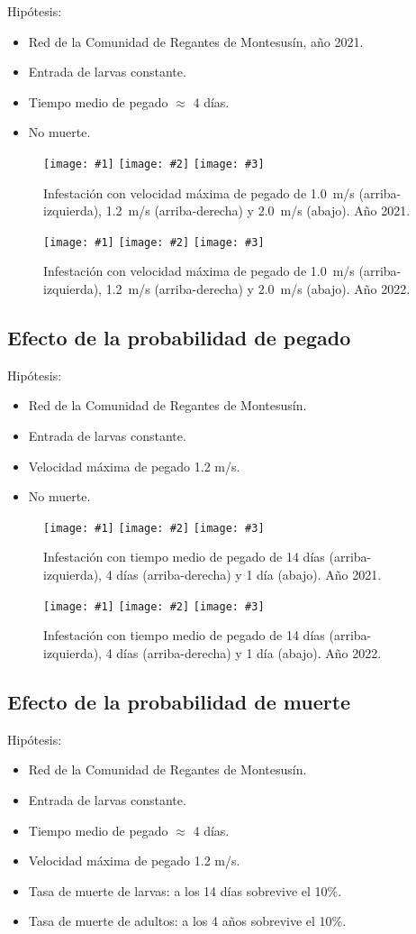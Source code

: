 \documentclass[a4paper]{article}
\newcommand{\FIGIII}[5]
{
	\begin{figure}[ht!]
		\centering
		\texttt{[image: \#1]}
		\texttt{[image: \#2]}
		\texttt{[image: \#3]}
		\caption{#4.\label{#5}}
	\end{figure}
}
\begin{document}
Hipótesis:
\begin{itemize}
\item Red de la Comunidad de Regantes de Montesusín, año 2021.
\item Entrada de larvas constante.
\item Tiempo medio de pegado $\approx$ 4 días.
\item No muerte.
\end{itemize}

\FIGIII{2021-mussel-velocity-1.0.pdf}{2021-mussel-constant.pdf}
{2021-mussel-velocity-2.0.pdf}{Infestación con velocidad máxima de pegado de
1.0~m/s (arriba-izquierda), 1.2~m/s (arriba-derecha) y 2.0~m/s (abajo). Año
2021}{Fig2021MusselVelocity}

\FIGIII{2022-mussel-velocity-1.0.pdf}{2022-mussel-constant.pdf}
{2022-mussel-velocity-2.0.pdf}{Infestación con velocidad máxima de pegado de
1.0~m/s (arriba-izquierda), 1.2~m/s (arriba-derecha) y 2.0~m/s (abajo). Año
2022}{Fig2022MusselVelocity}

\clearpage
\subsection{Efecto de la probabilidad de pegado}

Hipótesis:
\begin{itemize}
\item Red de la Comunidad de Regantes de Montesusín.
\item Entrada de larvas constante.
\item Velocidad máxima de pegado 1.2 m/s.
\item No muerte.
\end{itemize}

\FIGIII{2021-mussel-cling-1.1.pdf}{2021-mussel-constant.pdf}
{2021-mussel-cling-8.0.pdf}{Infestación con tiempo medio de pegado de
14 días (arriba-izquierda), 4 días (arriba-derecha) y 1 día (abajo). Año 2021}
{Fig2021MusselCling}

\FIGIII{2022-mussel-cling-1.1.pdf}{2022-mussel-constant.pdf}
{2022-mussel-cling-8.0.pdf}{Infestación con tiempo medio de pegado de
14 días (arriba-izquierda), 4 días (arriba-derecha) y 1 día (abajo). Año 2022}
{Fig2022MusselCling}

\clearpage
\subsection{Efecto de la probabilidad de muerte}

Hipótesis:
\begin{itemize}
\item Red de la Comunidad de Regantes de Montesusín.
\item Entrada de larvas constante.
\item Tiempo medio de pegado $\approx$ 4 días.
\item Velocidad máxima de pegado 1.2 m/s.
\item Tasa de muerte de larvas: a los 14 días sobrevive el 10\%.
\item Tasa de muerte de adultos: a los 4 años sobrevive el 10\%.
\end{itemize}
\end{document}
